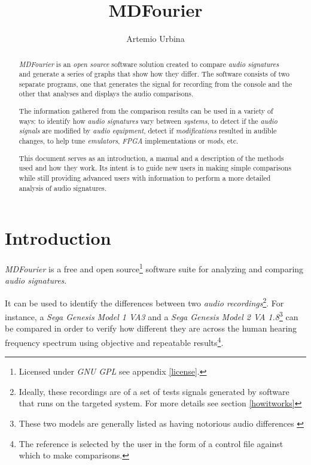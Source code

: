 \documentclass[10pt,a4paper]{report}
\title{MDFourier}
\author{Artemio Urbina}
\begin{document}
	
\begin{titlepage}
	\maketitle
	\thispagestyle{empty}
\end{titlepage}

\begin{abstract}
\textit{MDFourier} is an \textit{open source} software solution created to compare \textit{audio signatures} and generate a series of graphs that show how they differ. The software consists of two separate programs, one that generates the signal for recording from the console and the other that analyses and displays the audio comparisons. 

The information gathered from the comparison results can be used in a variety of ways: to identify how \textit{audio signatures} vary between \textit{systems}, to detect if the \textit{audio signals} are modified by \textit{audio equipment}, detect if \textit{modifications} resulted in audible changes, to help tune \textit{emulators}, \textit{FPGA} implementations or \textit{mods}, etc.

This document serves as an introduction, a manual and a description of the methods used and how they work. Its intent is to guide new users in making simple comparisons while still providing advanced users with information to perform a more detailed analysis of audio signatures.
\end{abstract}

\tableofcontents

\chapter{Introduction}

\textit{MDFourier} is a free and open source\footnote{Licensed under \textit{GNU GPL} see appendix \ref{license}.} software suite for analyzing and comparing \textit{audio signatures}.

It can be used to identify the differences between two \textit{audio recordings}\footnote{Ideally, these recordings are of a set of tests signals generated by software that runs on the targeted system. For more details see section \ref{howitworks}}. For instance, a \textit{Sega Genesis Model 1 VA3} and a \textit{Sega Genesis Model 2 VA 1.8}\footnote{These two models are generally listed as having notorious audio differences \cite{genesisaudio}} can be compared in order to verify how different they are across the human hearing frequency spectrum using objective and repeatable results\footnote{The reference is selected by the user in the form of a control file against which to make comparisons.}.
\end{document}
